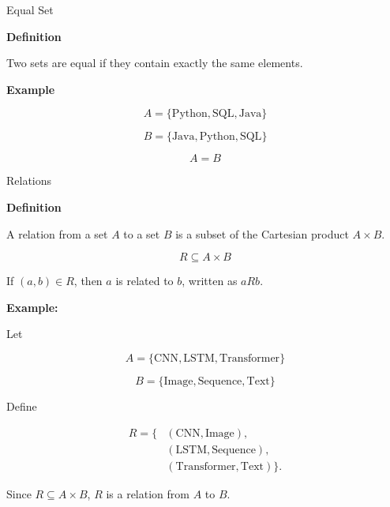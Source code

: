 \documentclass{beamer}
\begin{document}
\begin{frame}{Equal Set}

\textbf{Definition}

Two sets are equal if they contain exactly the same elements.

\vspace{0.2cm}

\textbf{Example }

\[
A=\{\text{Python},\text{SQL},\text{Java}\}
\]

\[
B=\{\text{Java},\text{Python},\text{SQL}\}
\]

\[
A=B
\]

\end{frame}
\begin{frame}{Relations}

\footnotesize

\textbf{Definition}

A relation from a set $A$ to a set $B$ is a subset of the Cartesian
product $A\times B$.

\[
R\subseteq A\times B
\]

If $(a,b)\in R$, then $a$ is related to $b$, written as $aRb$.

\vspace{0.2cm}

\textbf{Example:}

Let

\[
A=\{\text{CNN},\text{LSTM},\text{Transformer}\}
\]

\[
B=\{\text{Image},\text{Sequence},\text{Text}\}
\]

Define

\[
\begin{aligned}
R=\{&
(\text{CNN},\text{Image}),\\
&(\text{LSTM},\text{Sequence}),\\
&(\text{Transformer},\text{Text})
\}.
\end{aligned}
\]

Since $R\subseteq A\times B$, $R$ is a relation from $A$ to $B$.

\end{frame}
\end{document}
